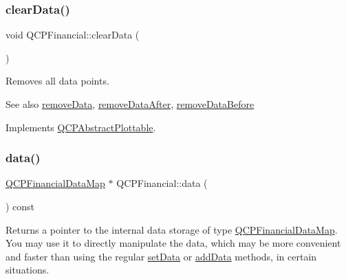 \subsubsection{\texorpdfstring{clear\+Data()}{clearData()}}
{\footnotesize\ttfamily void Q\+C\+P\+Financial\+::clear\+Data (\begin{DoxyParamCaption}{ }\end{DoxyParamCaption})\hspace{0.3cm}{\ttfamily [virtual]}}

Removes all data points.

\begin{DoxySeeAlso}{See also}
\hyperlink{class_q_c_p_financial_a048c741d3c8cc5709c2c44b759fdf27c}{remove\+Data}, \hyperlink{class_q_c_p_financial_aa0fcd357005288c833a230c7874825ba}{remove\+Data\+After}, \hyperlink{class_q_c_p_financial_a097c0383c7c1e9042ca7f93cb439d15a}{remove\+Data\+Before} 
\end{DoxySeeAlso}


Implements \hyperlink{class_q_c_p_abstract_plottable_a86e5b8fd4b6ff4f4084e7ea4c573fc53}{Q\+C\+P\+Abstract\+Plottable}.

\hypertarget{class_q_c_p_financial_a528c81578e4f25999a9169127763cfd4}{}\label{class_q_c_p_financial_a528c81578e4f25999a9169127763cfd4} 
\subsubsection{\texorpdfstring{data()}{data()}}
{\footnotesize\ttfamily \hyperlink{qcustomplot_8h_a745c09823fae0974b50beca9bc3b3d7d}{Q\+C\+P\+Financial\+Data\+Map} $\ast$ Q\+C\+P\+Financial\+::data (\begin{DoxyParamCaption}{ }\end{DoxyParamCaption}) const\hspace{0.3cm}{\ttfamily [inline]}}

Returns a pointer to the internal data storage of type \hyperlink{qcustomplot_8h_a745c09823fae0974b50beca9bc3b3d7d}{Q\+C\+P\+Financial\+Data\+Map}. You may use it to directly manipulate the data, which may be more convenient and faster than using the regular \hyperlink{class_q_c_p_financial_adf12a86082f1e488df6a4e8603f8fd6d}{set\+Data} or \hyperlink{class_q_c_p_financial_a1a83396f97fcc68f2b7aa8d9782feffe}{add\+Data} methods, in certain situations. \hypertarget{class_q_c_p_financial_a048c741d3c8cc5709c2c44b759fdf27c}{}\label{class_q_c_p_financial_a048c741d3c8cc5709c2c44b759fdf27c} 
